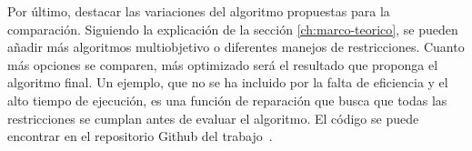 Por último, destacar las variaciones del algoritmo propuestas para la comparación. Siguiendo la explicación de la sección \ref{ch:marco-teorico}, se pueden añadir más algoritmos multiobjetivo o diferentes manejos de restricciones. Cuanto más opciones se comparen, más optimizado será el resultado que proponga el algoritmo final. Un ejemplo, que no se ha incluido por la falta de eficiencia y el alto tiempo de ejecución, es una función de reparación que busca que todas las restricciones se cumplan antes de evaluar el algoritmo. El código se puede encontrar en el repositorio Github del trabajo~\cite{quesada_reparacion}.